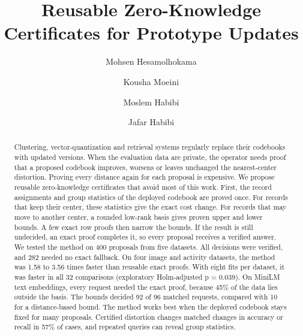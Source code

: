 \documentclass[5p,times,twocolumn]{elsarticle}
\begin{document}
\begin{frontmatter}
\title{Reusable Zero-Knowledge Certificates for Prototype Updates}
\author[aff1]{Mohsen Hesamolhokama}
\author[aff2]{Kousha Moeini}
\author[aff3]{Moslem Habibi}
\author[aff1]{Jafar Habibi}


\begin{abstract}
Clustering, vector-quantization and retrieval systems regularly replace their codebooks with updated versions. When the evaluation data are private, the operator needs proof that a proposed codebook improves, worsens or leaves unchanged the nearest-center distortion. Proving every distance again for each proposal is expensive. We propose reusable zero-knowledge certificates that avoid most of this work. First, the record assignments and group statistics of the deployed codebook are proved once. For records that keep their center, these statistics give the exact cost change. For records that may move to another center, a rounded low-rank basis gives proven upper and lower bounds. A few exact row proofs then narrow the bounds. If the result is still undecided, an exact proof completes it, so every proposal receives a verified answer. We tested the method on 400 proposals from five datasets. All decisions were verified, and 282 needed no exact fallback. On four image and activity datasets, the method was 1.58 to 3.56 times faster than reusable exact proofs. With eight fits per dataset, it was faster in all 32 comparisons (exploratory Holm-adjusted p = 0.039). On MiniLM text embeddings, every request needed the exact proof, because 45\% of the data lies outside the basis. The bounds decided 92 of 96 matched requests, compared with 10 for a distance-based bound. The method works best when the deployed codebook stays fixed for many proposals. Certified distortion changes matched changes in accuracy or recall in 57\% of cases, and repeated queries can reveal group statistics.
\end{abstract}



\end{frontmatter}
\end{document}
